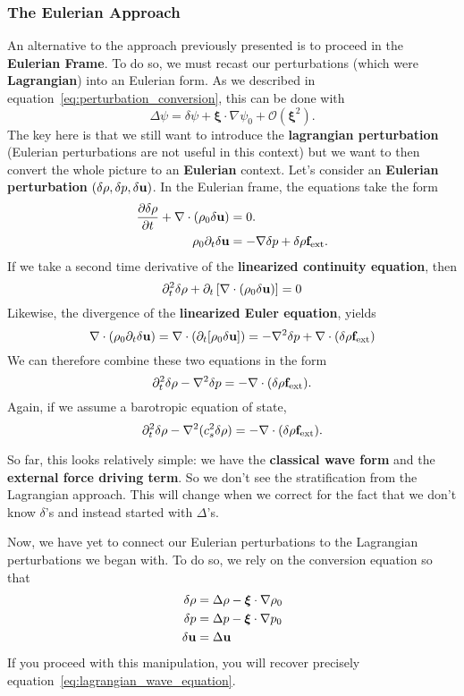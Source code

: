 \subsubsection*{The Eulerian Approach}

An alternative to the approach previously presented is to proceed in the \textbf{Eulerian Frame}. To do so, we must recast our perturbations (which were \textbf{Lagrangian}) into an Eulerian form. As we described in equation~\ref{eq:perturbation_conversion}, this can be done with
\[
\Delta \psi = \delta \psi + \boldsymbol{\xi} \cdot \nabla \psi_0 + \mathcal{O}(\boldsymbol{\xi}^2).
\]
The key here is that we still want to introduce the \textbf{lagrangian perturbation} (Eulerian perturbations are not useful in this context) but we want to then convert the whole picture to an \textbf{Eulerian} context. Let's consider an
\textbf{Eulerian perturbation} $(\delta \rho, \delta p, \delta {\bf u})$. In the Eulerian frame, the equations take the form
\[
\begin{aligned}
 \frac{\partial \delta \rho}{\partial t} + \nabla \cdot (\rho_0 \delta {\bf u}) &= 0.\\
\rho_0 \partial_t \delta {\bf u} &= -\nabla \delta p + \delta \rho {\bf f}_{\rm ext}.
\end{aligned}
\]
If we take a second time derivative of the \textbf{linearized continuity equation}, then
\[
\partial^2_t \delta \rho + \partial_t \left[\nabla \cdot (\rho_0 \delta {\bf u})\right] = 0
\]
Likewise, the divergence of the \textbf{linearized Euler equation}, yields
\[
\nabla \cdot (\rho_0 \partial_t \delta {\bf u}) =\nabla\cdot(\partial_t[\rho_0 \delta{\bf u}]) = -\nabla^2\delta p + \nabla \cdot (\delta \rho {\bf f}_{\rm ext})\]
We can therefore combine these two equations in the form
\[
\partial^2_t \delta \rho - \nabla^2 \delta p = - \nabla \cdot (\delta \rho {\bf f}_{\rm ext}).
\]
Again, if we assume a barotropic equation of state, 
\[
\partial_t^2 \delta \rho - \nabla^2 (c_s^2 \delta \rho) = - \nabla \cdot (\delta \rho {\bf f}_{\rm ext}).
\]

\begin{remark}
    So far, this looks relatively simple: we have the \textbf{classical wave form} and the \textbf{external force driving term}. So we don't see the stratification from the Lagrangian approach. This will change when we correct for the fact that we don't know $\delta$'s and instead started with $\Delta$'s.
\end{remark}

Now, we have yet to connect our Eulerian perturbations to the Lagrangian perturbations we began with. To do so, we rely on the conversion equation so that
\[
\begin{aligned}
    \delta \rho &= \Delta \rho - \boldsymbol{\xi} \cdot \nabla \rho_0\\
    \delta p &= \Delta p - \boldsymbol{\xi} \cdot \nabla p_0\\
    \delta {\bf u} &= \Delta {\bf u}\\
\end{aligned}
\]
If you proceed with this manipulation, you will recover precisely equation~\ref{eq:lagrangian_wave_equation}.

